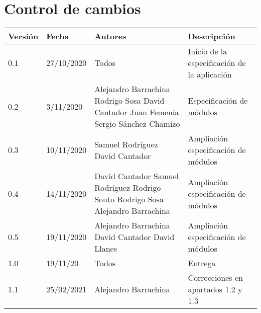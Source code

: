 \documentclass[12pt]{article}
\begin{document}
\section*{Control de cambios} %
\noindent\begin{tabularx}{\textwidth}{ |l|l|p{5cm}|X| }
	\hline
	\textbf{Versión} & \textbf{Fecha} & \textbf{Autores}                                                                                                         & \textbf{Descripción}                         \\
	\hline
	0.1              & 27/10/2020     & Todos                                                                                                                    & Inicio de la especificación de la aplicación \\
	\hline
	0.2              & 3/11/2020      & Alejandro Barrachina \newline Rodrigo Sosa \newline David Cantador \newline Juan Femenía \newline Sergio Sánchez Chamizo & Especificación de módulos                    \\
	\hline
	0.3              & 10/11/2020     & Samuel Rodríguez \newline David Cantador                                                                                 & Ampliación especificación de módulos         \\
	\hline
	0.4              & 14/11/2020     & David Cantador \newline Samuel Rodríguez \newline Rodrigo Souto \newline Rodrigo Sosa \newline Alejandro Barrachina      & Ampliación especificación de módulos         \\
	\hline
	0.5              & 19/11/2020     & Alejandro Barrachina \newline David Cantador \newline David Llanes                                                       & Ampliación especificación de módulos         \\
	\hline
	1.0              & 19/11/20       & Todos                                                                                                                    & Entrega                                      \\
	\hline
	1.1              & 25/02/2021     & Alejandro Barrachina                                                                                                     & Correcciones en apartados 1.2 y 1.3          \\

\end{tabularx}
\end{document}
